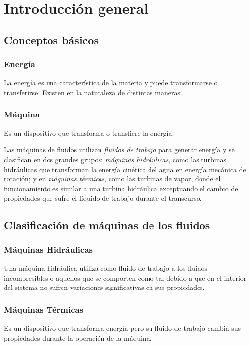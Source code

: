 	\section{Introducción general}

\vspace{-.5cm}

\subsection{Conceptos básicos}

\subsubsection{Energía} La energía es una característica de la materia y puede transformarse o transferirse. Existen en la naturaleza de distintas maneras.

\subsubsection{Máquina} Es un dispositivo que transforma o transfiere la energía.

Las máquinas de fluidos utilizan \textsl{fluidos de trabajo} para generar energía y se clasifican en dos grandes grupos: \textsl{máquinas hidráulicas}, como las turbinas hidráulicas que transforman la energía cinética del agua en energía mecánica de rotación; y en \textsl{máquinas térmicas}, como las turbinas de vapor, donde el funcionamiento es similar a una turbina hidráulica exceptuando el cambio de propiedades que sufre el líquido de trabajo durante el transcurso.

\subsection{Clasificación de máquinas de los fluidos}
\lipsum[1]
\subsubsection{Máquinas Hidráulicas} Una máquina hidráulica utiliza como fluido de trabajo a los fluidos incompresibles o aquellos que se comporten como tal debido a que en el interior del sistema no sufren variaciones significativas en sus propiedades.
\subsubsection{Máquinas Térmicas} Es un dispositivo que transforma energía pero su fluido de trabajo cambia sus propiedades durante la operación de la máquina.

